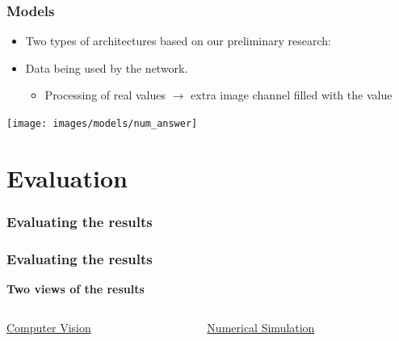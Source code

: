 \documentclass[18pt]{beamer}
\begin{document}
\begin{frame}[t]
  \frametitle{Models}
  \begin{itemize}
  \item Two types of architectures based on our preliminary research:
  \item Data being used by the network.
    \begin{itemize}
    \item Processing of real values $\rightarrow$ extra image channel filled with the value
    \end{itemize}
  \end{itemize}

  \vspace{0.3cm}
    \begin{center}
    \texttt{[image: images/models/num\_answer]}
  \end{center}
  
\end{frame}

\section{Evaluation}

\begin{frame}
  \frametitle{Evaluating the results}
\end{frame}

\begin{frame}[t]
  \frametitle{Evaluating the results}
  \begin{center}
    \textbf{\Large Two views of the results}
  \end{center}
  \vspace{-1cm}
  \begin{columns}[t]
    \begin{column}{0.5\textwidth}
      \begin{center}
        {\large \underline{Computer Vision}}
      \end{center}
    \end{column}
    \begin{column}{0.5\textwidth}
      \begin{center}
        {\large \underline{Numerical Simulation}}
      \end{center}  
    \end{column}
  \end{columns}
\end{frame}
\end{document}
